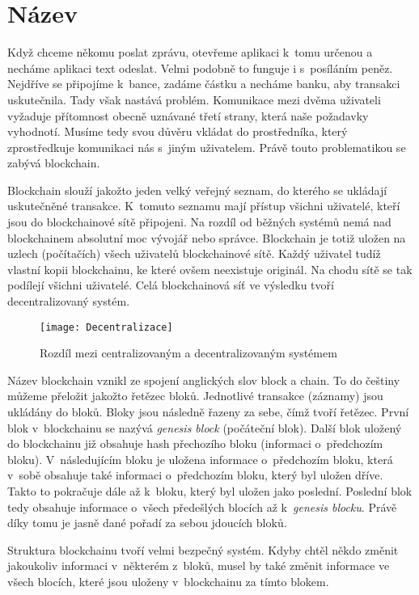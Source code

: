 \documentclass[12pt]{report}			%
\begin{document}
		\section{Název}{
Když chceme někomu poslat zprávu, otevřeme aplikaci k~tomu určenou a necháme aplikaci text odeslat. Velmi podobně to funguje i s~posíláním peněz. Nejdříve se připojíme k~bance, zadáme částku a necháme banku, aby transakci uskutečnila. Tady však nastává problém. Komunikace mezi dvěma uživateli vyžaduje přítomnost obecně uznávané třetí strany, která naše požadavky vyhodnotí. Musíme tedy svou důvěru vkládat do prostředníka, který zprostředkuje komunikaci nás s~jiným uživatelem. Právě touto problematikou se zabývá blockchain.

Blockchain slouží jakožto jeden velký veřejný seznam, do kterého se ukládají uskutečněné transakce. K~tomuto seznamu mají přístup všichni uživatelé, kteří jsou do blockchainové sítě připojeni. Na rozdíl od běžných systémů nemá nad blockchainem absolutní moc vývojář nebo správce. Blockchain je totiž uložen na uzlech (počítačích) všech uživatelů blockchainové sítě. Každý uživatel tudíž vlastní kopii blockchainu, ke které ovšem neexistuje originál. Na chodu sítě se tak podílejí všichni uživatelé. Celá blockchainová síť ve výsledku tvoří decentralizovaný systém. \cite{Antonopoulos2017}

\begin{figure}[h]
\caption{Rozdíl mezi centralizovaným a decentralizovaným systémem \cite{Kes2014}}
\texttt{[image: Decentralizace]}	
\centering
\label{Decentralizace}
\end{figure}	

Název blockchain vznikl ze spojení anglických slov block a chain. To do češtiny můžeme přeložit jakožto řetězec bloků. Jednotlivé transakce (záznamy) jsou ukládány do bloků. Bloky jsou následně řazeny za sebe, čímž tvoří řetězec. První blok v~blockchainu se nazývá \textit{genesis block} (počáteční blok). Další blok uložený do blockchainu již obsahuje hash přechozího bloku (informaci o~předchozím bloku). V~následujícím bloku je uložena informace o~předchozím bloku, která v~sobě obsahuje také informaci o~předchozím bloku, který byl uložen dříve. Takto to pokračuje dále až k~bloku, který byl uložen jako poslední. Poslední blok tedy obsahuje informace o~všech předešlých blocích až k~\textit{genesis blocku}. Právě díky tomu je jasně dané pořadí za sebou jdoucích bloků.  \cite{Stroukal2021}

Struktura blockchainu tvoří velmi bezpečný systém. Kdyby chtěl někdo změnit jakoukoliv informaci v~některém z~bloků, musel by také změnit informace ve všech blocích, které jsou uloženy v~blockchainu za tímto blokem. \cite{Stroukal2021}
}
\end{document}
